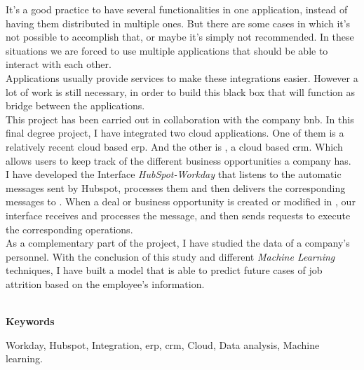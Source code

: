 	It's a good practice to have several functionalities in one application, instead of having them distributed in multiple ones. But there are some cases in which
	it’s not possible to accomplish that, or maybe it's simply not recommended. In these situations we are
	forced to use multiple applications that should be able to interact with each other.\\

	Applications usually provide services to make these integrations easier. However a lot of work is still necessary, in order to build this black box that will function as bridge between the applications.\\
	
	This project has been carried out in collaboration with the company \acrfull{bnb}. In this final degree project, I have integrated two cloud applications. One of
	them is \wday{} a relatively recent cloud based \acrfull{erp}. And the other is \hs{}, a cloud based \acrfull{crm}.
	Which allows users to keep track of the different business opportunities a company has.\\
	
	I have developed the Interface \textit{HubSpot-Workday} that listens to the automatic messages sent by Hubspot,
	processes them and then delivers the corresponding messages to \wday{}. When a deal or business
	opportunity is created or modified in \hs{}, our interface receives and processes the message, and then sends \wday{} requests to execute the corresponding operations.\\

	As a complementary part of the project, I have studied the data of a company’s personnel. 
	With the conclusion of this study and different \textit{Machine Learning} techniques, I have
	built a model that is able to predict future cases of job attrition based on the employee's information.\\

	
	
	
	\
	
	\textbf{Keywords}
    
    Workday, Hubspot, Integration, \acrfull{erp}, \acrfull{crm}, Cloud, Data analysis, Machine learning.
	
	
